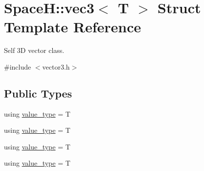 \hypertarget{struct_space_h_1_1vec3}{}\section{SpaceH\+:\+:vec3$<$ T $>$ Struct Template Reference}
\label{struct_space_h_1_1vec3}


Self 3D vector class.  




{\ttfamily \#include $<$vector3.\+h$>$}

\subsection*{Public Types}
\begin{DoxyCompactItemize}
\item 
using \mbox{\hyperlink{struct_space_h_1_1vec3_a08579f643d09de9cf876530068fe8f7d}{value\+\_\+type}} = T
\item 
using \mbox{\hyperlink{struct_space_h_1_1vec3_a08579f643d09de9cf876530068fe8f7d}{value\+\_\+type}} = T
\item 
using \mbox{\hyperlink{struct_space_h_1_1vec3_a08579f643d09de9cf876530068fe8f7d}{value\+\_\+type}} = T
\item 
using \mbox{\hyperlink{struct_space_h_1_1vec3_a08579f643d09de9cf876530068fe8f7d}{value\+\_\+type}} = T
\end{DoxyCompactItemize}

